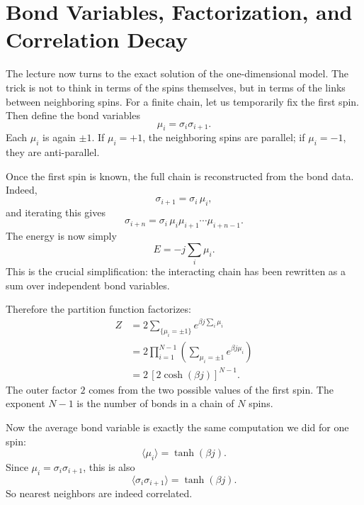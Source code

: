 \section{Bond Variables, Factorization, and Correlation Decay}

The lecture now turns to the exact solution of the one-dimensional model. The trick is not to think in terms of the spins themselves, but in terms of the links between neighboring spins. For a finite chain, let us temporarily fix the first spin. Then define the bond variables
\begin{equation}
\mu_i=\sigma_i \sigma_{i+1}.
\end{equation}
Each \(\mu_i\) is again \(\pm1\). If \(\mu_i=+1\), the neighboring spins are parallel; if \(\mu_i=-1\), they are anti-parallel.

Once the first spin is known, the full chain is reconstructed from the bond data. Indeed,
\begin{equation}
\sigma_{i+1}=\sigma_i\,\mu_i,
\end{equation}
and iterating this gives
\begin{equation}
\sigma_{i+n}=\sigma_i\,\mu_i \mu_{i+1}\cdots \mu_{i+n-1}.
\end{equation}
The energy is now simply
\begin{equation}
E=-j\sum_i \mu_i.
\end{equation}
This is the crucial simplification: the interacting chain has been rewritten as a sum over independent bond variables.

Therefore the partition function factorizes:
\begin{align}
Z
&= 2 \sum_{\{\mu_i=\pm1\}} e^{\beta j \sum_i \mu_i} \\
&= 2 \prod_{i=1}^{N-1} \left( \sum_{\mu_i=\pm1} e^{\beta j \mu_i} \right) \\
&= 2\,[2\cosh(\beta j)]^{N-1}.
\end{align}
The outer factor \(2\) comes from the two possible values of the first spin. The exponent \(N-1\) is the number of bonds in a chain of \(N\) spins.

Now the average bond variable is exactly the same computation we did for one spin:
\begin{equation}
\langle \mu_i\rangle=\tanh(\beta j).
\end{equation}
Since \(\mu_i=\sigma_i\sigma_{i+1}\), this is also
\begin{equation}
\langle \sigma_i \sigma_{i+1}\rangle=\tanh(\beta j).
\end{equation}
So nearest neighbors are indeed correlated.

